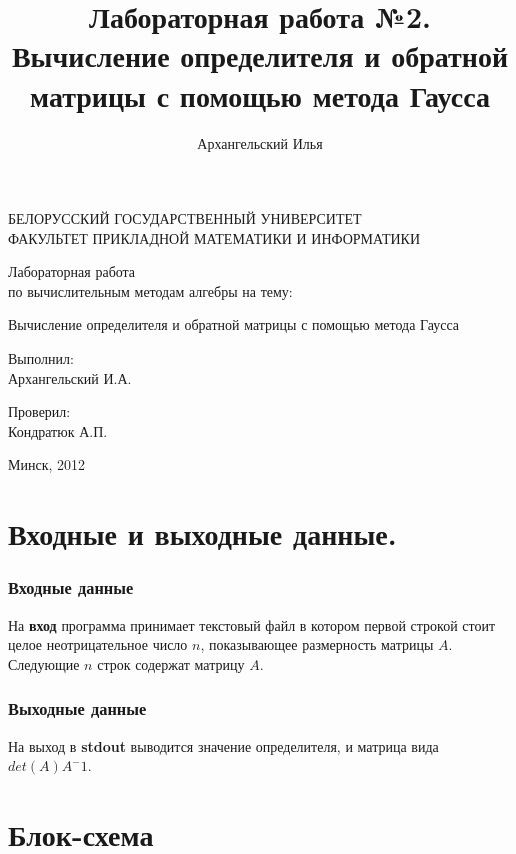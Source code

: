\documentclass[a4paper,11pt]{article}
\title{Лабораторная работа №2. Вычисление определителя и обратной матрицы с помощью метода Гаусса}
\author{Архангельский Илья}
\begin{document}
\begin{titlepage}
	\begin{center}
		БЕЛОРУССКИЙ ГОСУДАРСТВЕННЫЙ УНИВЕРСИТЕТ \\
		ФАКУЛЬТЕТ ПРИКЛАДНОЙ МАТЕМАТИКИ И ИНФОРМАТИКИ
	\end{center}
	\vspace{10em}
	\begin{center}
		\LARGE {Лабораторная работа \\
		по вычислительным методам алгебры на тему:}
		\linebreak	 
		
		Вычисление определителя и обратной матрицы с помощью метода Гаусса
	\end{center}
	\vspace{3em}
	\begin{flushright}
	  
	
 	Выполнил: \\	Архангельский И.А. \\ 
 	
 	  \vspace{1em}
 	
 	  Проверил: \\ Кондратюк А.П. \\
 	
	\end{flushright}
	
	\vfill
	\begin{center}
		Минск, 2012
	\end{center}
\end{titlepage} 

\newpage
\part*{Входные и выходные данные.} 
\section*{Входные данные}
На \textbf{вход} программа принимает текстовый файл в котором первой строкой стоит целое неотрицательное число $n$, показывающее размерность матрицы $A$. Следующие $n$ строк содержат матрицу $A$. 
\section*{Выходные данные}
На выход в \textbf{stdout} выводится значение определителя, и матрица вида $det(A) A^-1$.
\newpage
\part*{Блок-схема} 
\end{document}
